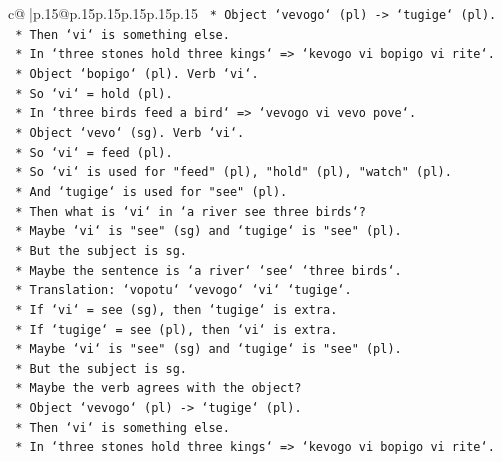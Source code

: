 \documentclass{article}
\begin{document}
{\begin{supertabular}{c@{$\;$}|p{.15\linewidth}@{}p{.15\linewidth}p{.15\linewidth}p{.15\linewidth}p{.15\linewidth}p{.15\linewidth}}
{{{\texttt{                *   Object `vevogo` (pl) {-}> `tugige` (pl).} \\
\texttt{                *   Then `vi` is something else.} \\
\texttt{                *   In `three stones hold three kings` => `kevogo vi bopigo vi rite`.} \\
\texttt{                *   Object `bopigo` (pl). Verb `vi`.} \\
\texttt{                *   So `vi` = hold (pl).} \\
\texttt{                *   In `three birds feed a bird` => `vevogo vi vevo pove`.} \\
\texttt{                *   Object `vevo` (sg). Verb `vi`.} \\
\texttt{                *   So `vi` = feed (pl).} \\
\texttt{                *   So `vi` is used for "feed" (pl), "hold" (pl), "watch" (pl).} \\
\texttt{                *   And `tugige` is used for "see" (pl).} \\
\texttt{                *   Then what is `vi` in `a river see three birds`?} \\
\texttt{                *   Maybe `vi` is "see" (sg) and `tugige` is "see" (pl).} \\
\texttt{                *   But the subject is sg.} \\
\texttt{                *   Maybe the sentence is `a river` `see` `three birds`.} \\
\texttt{                *   Translation: `vopotu` `vevogo` `vi` `tugige`.} \\
\texttt{                *   If `vi` = see (sg), then `tugige` is extra.} \\
\texttt{                *   If `tugige` = see (pl), then `vi` is extra.} \\
\texttt{                *   Maybe `vi` is "see" (sg) and `tugige` is "see" (pl).} \\
\texttt{                *   But the subject is sg.} \\
\texttt{                *   Maybe the verb agrees with the object?} \\
\texttt{                *   Object `vevogo` (pl) {-}> `tugige` (pl).} \\
\texttt{                *   Then `vi` is something else.} \\
\texttt{                *   In `three stones hold three kings` => `kevogo vi bopigo vi rite`.} \\
}}}
\end{supertabular}}
\end{document}
